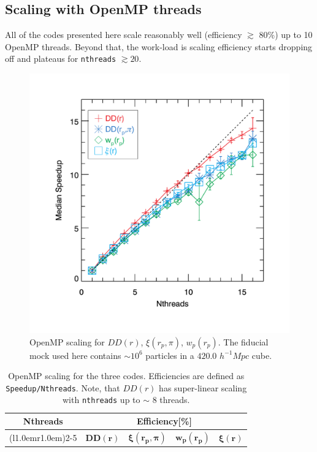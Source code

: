 \documentclass[12pt,titlepage]{article}
\newcommand{\xir}{\ensuremath{{DD(r)}}\xspace}
\newcommand{\xiofr}{\ensuremath{{\xi(r)}}\xspace}
\newcommand{\wprp}{\ensuremath{{w_p(r_p)}}\xspace}
\newcommand{\xirppi}{\ensuremath{{\xi(r_p,\pi)}}\xspace}
\newcommand{\hMpc}{\ensuremath{{h^{-1}Mpc}}\xspace}
\begin{document}
\subsection{Scaling with OpenMP threads}
All of the codes presented here scale reasonably well (efficiency $\gtrsim$ 80\%) up to 10 OpenMP threads. Beyond that, the work-load is 
scaling efficiency starts dropping off and plateaus for \texttt{nthreads} $\gtrsim 20$. 
\begin{figure}[htbp]
\includegraphics[clip=true,width=\linewidth]{timings_Mr19_openmp}%
\caption{OpenMP scaling for \xir, \xirppi, \wprp. The fiducial mock used here contains $\sim 10^6$ particles 
in a $420.0$ \hMpc cube. }
\label{fig:scaling_openmp}
\end{figure}

\begin{table}
\centering
\caption{\footnotesize OpenMP scaling for the three codes. Efficiencies are defined 
as \texttt{Speedup/Nthreads}. Note, that \xir has super-linear scaling with \texttt{nthreads}
up to $\sim$ 8 threads.}
\begin{adjustbox}{max width=\textwidth}
\begin{tabular}{ccccc} 
\toprule
\multirow{2}{*}{\textbf{Nthreads}}   &
\multicolumn{4}{c}{\textbf{Efficiency[\%]}} \\
\cmidrule(l{1.0em}r{1.0em}){2-5}
&
\multicolumn{1}{c}{$\boldsymbol{\xir}$}    &
\multicolumn{1}{c}{$\boldsymbol{\xirppi}$} &
\multicolumn{1}{c}{$\boldsymbol{\wprp}$}   & 
\multicolumn{1}{c}{$\boldsymbol{\xiofr}$}   \\
\midrule
 
\bottomrule
\end{tabular}
\end{adjustbox}
\label{table:openmp}
\end{table}
\end{document}
